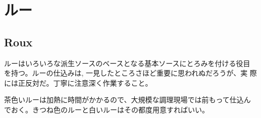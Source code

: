 \documentclass[twoside,12Q,b5j]{escoffierltjsbook}
\begin{document}
\section{ルー}\label{ux30ebux30fc}

\subsection{Roux}\label{roux}

 

ルーはいろいろな派生ソースのベースとなる基本ソースにとろみを付ける役目
を持つ。ルーの仕込みは, 一見したところさほど重要に思われぬだろうが、実
際には正反対だ。丁寧に注意深く作業すること。

茶色いルーは加熱に時間がかかるので、大規模な調理現場では前もって仕込ん
でおく。きつね色のルーと白いルーはその都度用意すればいい。

\vspace*{2\zw}
\end{document}
